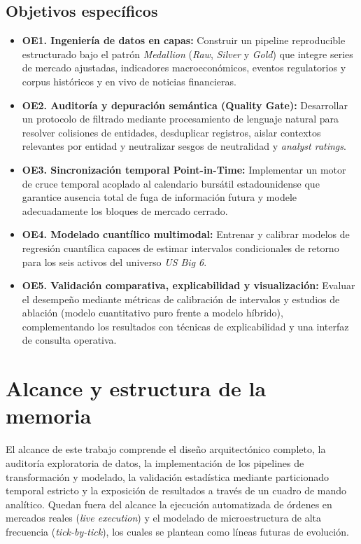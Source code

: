 \documentclass[11pt, a4paper]{report}
\begin{document}
\subsection*{Objetivos específicos}
\begin{itemize}
    \item \textbf{OE1. Ingeniería de datos en capas:} Construir un pipeline reproducible estructurado bajo el patrón \textit{Medallion} (\textit{Raw}, \textit{Silver} y \textit{Gold}) que integre series de mercado ajustadas, indicadores macroeconómicos, eventos regulatorios y corpus históricos y en vivo de noticias financieras.
    \item \textbf{OE2. Auditoría y depuración semántica (Quality Gate):} Desarrollar un protocolo de filtrado mediante procesamiento de lenguaje natural para resolver colisiones de entidades, desduplicar registros, aislar contextos relevantes por entidad y neutralizar sesgos de neutralidad y \textit{analyst ratings}.
    \item \textbf{OE3. Sincronización temporal Point-in-Time:} Implementar un motor de cruce temporal acoplado al calendario bursátil estadounidense que garantice ausencia total de fuga de información futura y modele adecuadamente los bloques de mercado cerrado.
    \item \textbf{OE4. Modelado cuantílico multimodal:} Entrenar y calibrar modelos de regresión cuantílica capaces de estimar intervalos condicionales de retorno para los seis activos del universo \textit{US Big 6}.
    \item \textbf{OE5. Validación comparativa, explicabilidad y visualización:} Evaluar el desempeño mediante métricas de calibración de intervalos y estudios de ablación (modelo cuantitativo puro frente a modelo híbrido), complementando los resultados con técnicas de explicabilidad y una interfaz de consulta operativa.
\end{itemize}

\section{Alcance y estructura de la memoria}
El alcance de este trabajo comprende el diseño arquitectónico completo, la auditoría exploratoria de datos, la implementación de los pipelines de transformación y modelado, la validación estadística mediante particionado temporal estricto y la exposición de resultados a través de un cuadro de mando analítico. Quedan fuera del alcance la ejecución automatizada de órdenes en mercados reales (\textit{live execution}) y el modelado de microestructura de alta frecuencia (\textit{tick-by-tick}), los cuales se plantean como líneas futuras de evolución.
\end{document}
